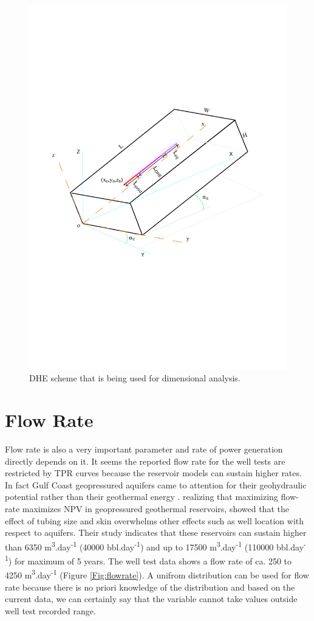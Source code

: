 \documentclass[review,authoryear, 12pt]{elsarticle}\usepackage[]{graphicx}\usepackage[]{color}
\begin{document}
\begin{figure}
\centering
\includegraphics[width=0.75\linewidth]{./figure/DHE}
\caption{DHE scheme that is being used for dimensional analysis.} 
\label{Fig:DHEscheme}
\end{figure}
 


\section{Flow Rate}
Flow rate is also a very important parameter and rate of power generation directly depends on it. It seems the reported flow rate for the well tests are restricted by TPR curves because the reservoir models can sustain higher rates. In fact Gulf Coast geopressured aquifers came to attention for their geohydraulic potential rather than their geothermal energy \citep{Hawkins1977}. \citet{McMullan1984} realizing that maximizing flow-rate maximizes NPV in geopressured geothermal reservoirs, showed that the effect of tubing size and skin overwhelms other effects such as well location with respect to aquifers. Their study indicates that these reservoirs can sustain higher than 6350 m\textsuperscript{3}.day\textsuperscript{-1} (40000 bbl.day\textsuperscript{-1}) and up to 17500 m\textsuperscript{3}.day\textsuperscript{-1} (110000 bbl.day\textsuperscript{-1}) for maximum of 5 years. The well test data shows a flow rate of ca. 250 to 4250 m\textsuperscript{3}.day\textsuperscript{-1} (Figure \ref{Fig:flowrate}). A unifrom distribution can be used for flow rate because there is no priori knowledge of the distribution and based on the current data, we can certainly say that the variable cannot take values outside well test recorded range. 
\end{document}
